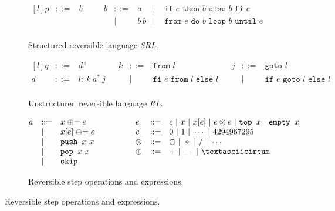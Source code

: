 \begin{figure}[b!]

  \begin{subfigure}{\textwidth}
    \center
    $$\begin{matrix*}[l]
      {p} & ::= & {b} & \quad & {b} & ::= & a             & | & \texttt{ if }e\texttt{ then }b\texttt{ else }b\texttt{ fi }e\\
                 &     &           &        &            &  |  & b\ b & | & \texttt{ from }e\texttt{ do }b\texttt{ loop }b\texttt{ until }e\\
    \end{matrix*}$$
    \caption{Structured reversible language \textit{SRL}.}
    \label{fig:srlspec}
  \end{subfigure}

  \begin{subfigure}{\textwidth}
    \center
    $$\begin{matrix*}[l]
      {q} & ::= & {d}^+                                      & & {k} & ::= & \texttt{from }l & & {j} & ::= & \texttt{goto }l\\
      {d} & ::= & {l}:\ {k}\ {a}^*\ {j} &       &            &  |  & \texttt{fi }e\texttt{ from }l\texttt{ else }l &
        & & | & \texttt{if }e\texttt{ goto }l\texttt{ else }l\\
    \end{matrix*}$$
    \caption{Unstructured reversible language \textit{RL}.}
    \label{fig:rlspec}
  \end{subfigure}

  \begin{subfigure}{\textwidth}
    \center
    $$\begin{matrix*}[l]
      {a} & ::= & {x}\mathrel{\oplus}= e & \quad\quad\quad &  e & ::= & {c} \ | \ {x} \ | \ {x}[ e] \ | \  e\otimes e \ | \ \texttt{top }{x} \ | \ \texttt{empty }{x}\\
                 &  |  & {x}[ e]\mathrel{\oplus}= e &     & {c} & ::= & 0\ | \ 1\ |\ \cdots\ |\ 4294967295\\
                 &  |  & \texttt{push }{x}\ {x}      &     & \otimes    & ::= & \oplus \ | \ * \ | \ / \ | \ \cdots\\
                 &  |  & \texttt{pop  }{x}\ {x}      &     & \oplus     & ::= & +  \ | \  -  \ | \  \textasciicircum\\
                 &  |  & \texttt{skip}\\
    \end{matrix*}$$
    \caption{Reversible step operations and expressions.}
  \end{subfigure}


\end{figure}

